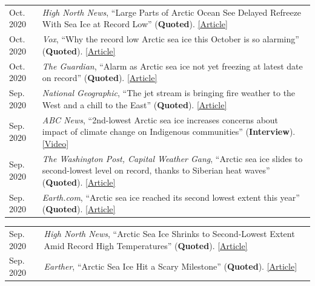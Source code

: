 \documentclass[margin,line,palatino,courier,10pt]{res}
\begin{document}
\begin{resume}
\begin{tabular}{@{}p{0.9in}p{4in}}
Oct. 2020 & \textit{High North News}, ``Large Parts of Arctic Ocean See Delayed Refreeze With Sea Ice at Record Low'' (\textbf{Quoted}). \href{https://www.highnorthnews.com/en/large-parts-arctic-ocean-see-delayed-refreeze-sea-ice-record-low}{[Article]}\\
Oct. 2020 & \textit{Vox}, ``Why the record low Arctic sea ice this October is so alarming'' (\textbf{Quoted}). \href{https://www.vox.com/21536859/arctic-sea-ice-2020-climate-change-alaska-polar-bears-charts}{[Article]}\\
Oct. 2020 & \textit{The Guardian}, ``Alarm as Arctic sea ice not yet freezing at latest date on record'' (\textbf{Quoted}). \href{https://www.theguardian.com/world/2020/oct/22/alarm-as-arctic-sea-ice-not-yet-freezing-at-latest-date-on-record}{[Article]}\\
Sep. 2020 & \textit{National Geographic}, ``The jet stream is bringing fire weather to the West and a chill to the East'' (\textbf{Quoted}). \href{https://www.nationalgeographic.com/science/2020/09/jet-stream-fire-weather-california-chill-eastern-us/}{[Article]}\\
Sep. 2020 & \textit{ABC News}, ``2nd-lowest Arctic sea ice increases concerns about impact of climate change on Indigenous communities'' (\textbf{Interview}). \href{https://abcnews.go.com/International/2nd-lowest-arctic-sea-ice-increases-concerns-impact/story?id=73224755}{[Video]}\\
Sep. 2020 & \textit{The Washington Post, Capital Weather Gang}, ``Arctic sea ice slides to second-lowest level on record, thanks to Siberian heat waves'' (\textbf{Quoted}). \href{https://www.washingtonpost.com/weather/2020/09/22/arctic-sea-ice-low/}{[Article]}\\
Sep. 2020 & \textit{Earth.com}, ``Arctic sea ice reached its second lowest extent this year'' (\textbf{Quoted}). \href{https://www.earth.com/news/arctic-sea-ice-reached-its-second-lowest-extent-this-year/}{[Article]}\\
\end{tabular}
\begin{tabular}{@{}p{0.9in}p{4in}}
Sep. 2020 & \textit{High North News}, ``Arctic Sea Ice Shrinks to Second-Lowest Extent Amid Record High Temperatures'' (\textbf{Quoted}). \href{https://www.highnorthnews.com/en/arctic-sea-ice-shrinks-second-lowest-extent-amid-record-high-temperatures}{[Article]}\\
Sep. 2020 & \textit{Earther}, ``Arctic Sea Ice Hit a Scary Milestone'' (\textbf{Quoted}). \href{https://earther.gizmodo.com/arctic-sea-ice-hit-a-scary-milestone-1845133739}{[Article]}\\

\end{tabular}
\end{resume}
\end{document}

